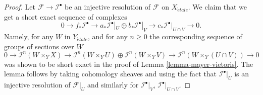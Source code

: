 \documentclass[10pt,a4paper]{amsart}
\theoremstyle{plain}
\theoremstyle{definition}
\theoremstyle{remark}
\numberwithin{equation}{subsection}
\def\etale{{\acute{e}tale}}
\begin{document}
\begin{proof}
Let $\mathcal{F} \to \mathcal{I}^\bullet$ be an injective resolution
of $\mathcal{F}$ on $X_\etale$. We claim that we
get a short exact sequence of complexes
$$
0 \to
f_*\mathcal{I}^\bullet \to
a_*\mathcal{I}^\bullet|_U \oplus b_*\mathcal{I}^\bullet|_V \to
c_*\mathcal{I}^\bullet|_{U \cap V} \to
0.
$$
Namely, for any $W$ in $Y_\etale$, and for any $n \geq 0$ the
corresponding sequence of groups of sections over $W$
$$
0 \to
\mathcal{I}^n(W \times_Y X) \to
\mathcal{I}^n(W \times_Y U)
\oplus \mathcal{I}^n(W \times_Y V) \to
\mathcal{I}^n(W \times_Y (U \cap V)) \to
0
$$
was shown to be short exact in the proof of Lemma \ref{lemma-mayer-vietoris}.
The lemma follows by taking cohomology sheaves and using the fact that
$\mathcal{I}^\bullet|_U$ is an injective resolution of $\mathcal{F}|_U$
and similarly for $\mathcal{I}^\bullet|_V$, $\mathcal{I}^\bullet|_{U \cap V}$.
\end{proof}
\end{document}
